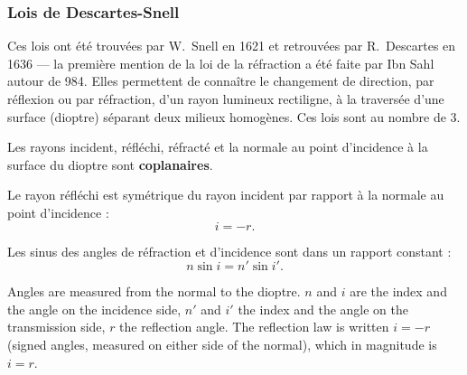 \subsubsection{Lois de Descartes-Snell}

Ces lois ont été trouvées par W.~Snell en 1621 et retrouvées par R.~Descartes en
1636 --- la première mention de la loi de la réfraction a été faite par Ibn Sahl
autour de 984. Elles permettent de connaître le changement de direction, par
réflexion ou par réfraction, d'un rayon lumineux rectiligne, à la traversée d'une
surface (dioptre) séparant deux milieux homogènes. Ces lois sont au nombre de 3.

\begin{theorem}
  \begin{subpart}
    \item Les rayons incident, réfléchi, réfracté et la normale au point
      d'incidence à la surface du dioptre sont \textbf{coplanaires}.
    \item Le rayon réfléchi est symétrique du rayon incident par rapport à la
      normale au point d'incidence :
      \[ i = -r. \]
    \item Les sinus des angles de réfraction et d'incidence sont dans un rapport
      constant :
      \[ n \sin i = n' \sin i'. \]
  \end{subpart}
\end{theorem}

\begin{notation}
  Angles are measured from the normal to the dioptre. $n$ and $i$ are the index
  and the angle on the incidence side, $n'$ and $i'$ the index and the angle on
  the transmission side, $r$ the reflection angle. The reflection law is written
  $i = -r$ (signed angles, measured on either side of the normal), which in
  magnitude is $i = r$.
\end{notation}

